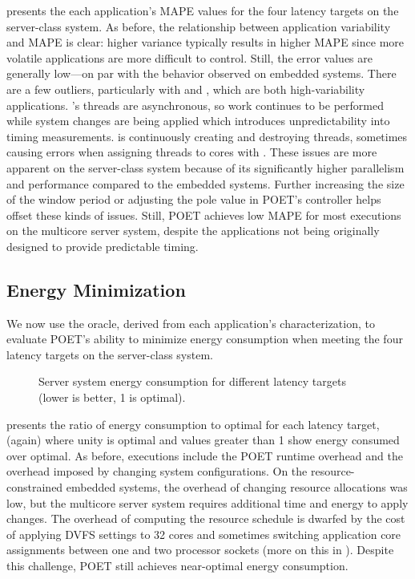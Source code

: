  presents the each application's MAPE values for the four latency targets on the server-class system.
As before, the relationship between application variability and MAPE is clear: higher variance typically results in higher MAPE since more volatile applications are more difficult to control.
Still, the error values are generally low---on par with the behavior observed on embedded systems.
There are a few outliers, particularly with  and , which are both high-variability applications.
's threads are asynchronous, so work continues to be performed while system changes are being applied which introduces unpredictability into timing measurements.
 is continuously creating and destroying threads, sometimes causing errors when assigning threads to cores with .
These issues are more apparent on the server-class system because of its significantly higher parallelism and performance compared to the embedded systems.
Further increasing the size of the window period or adjusting the pole value in POET's controller helps offset these kinds of issues.
Still, POET achieves low MAPE for most executions on the multicore server system, despite the applications not being originally designed to provide predictable timing.


\subsection{Energy Minimization}

We now use the oracle, derived from each application's characterization, to evaluate POET's ability to minimize energy consumption when meeting the four latency targets on the server-class system.

\begin{figure}[t]
  \centering
    
  \caption{Server system energy consumption for different latency targets (lower is better, 1 is optimal).}
  \label{fig:poet-server-ee}
\end{figure}

 presents the ratio of energy consumption to optimal for each latency target, (again) where unity is optimal and values greater than 1 show energy consumed over optimal.
As before, executions include the POET runtime overhead and the overhead imposed by changing system configurations.
On the resource-constrained embedded systems, the overhead of changing resource allocations was low, but the multicore server system requires additional time and energy to apply changes.
The overhead of computing the resource schedule is dwarfed by the cost of applying DVFS settings to 32 cores and sometimes switching application core assignments between one and two processor sockets (more on this in ).
Despite this challenge, POET still achieves near-optimal energy consumption.

